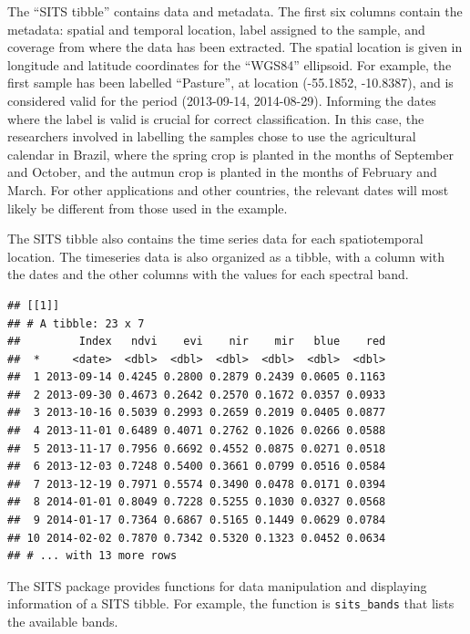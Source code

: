 \documentclass[11pt,]{article}
\newenvironment{Shaded}{\begin{snugshade}}{\end{snugshade}}
\newcommand{\DecValTok}[1]{\textcolor[rgb]{0.00,0.00,0.81}{#1}}
\newcommand{\CommentTok}[1]{\textcolor[rgb]{0.56,0.35,0.01}{\textit{#1}}}
\newcommand{\OperatorTok}[1]{\textcolor[rgb]{0.81,0.36,0.00}{\textbf{#1}}}
\newcommand{\NormalTok}[1]{#1}
\begin{document}
The ``SITS tibble'' contains data and metadata. The first six columns
contain the metadata: spatial and temporal location, label assigned to
the sample, and coverage from where the data has been extracted. The
spatial location is given in longitude and latitude coordinates for the
``WGS84'' ellipsoid. For example, the first sample has been labelled
``Pasture'', at location (-55.1852, -10.8387), and is considered valid
for the period (2013-09-14, 2014-08-29). Informing the dates where the
label is valid is crucial for correct classification. In this case, the
researchers involved in labelling the samples chose to use the
agricultural calendar in Brazil, where the spring crop is planted in the
months of September and October, and the autmun crop is planted in the
months of February and March. For other applications and other
countries, the relevant dates will most likely be different from those
used in the example.

The SITS tibble also contains the time series data for each
spatiotemporal location. The timeseries data is also organized as a
tibble, with a column with the dates and the other columns with the
values for each spectral band.

\begin{Shaded}
\end{Shaded}

\begin{verbatim}
## [[1]]
## # A tibble: 23 x 7
##         Index   ndvi    evi    nir    mir   blue    red
##  *     <date>  <dbl>  <dbl>  <dbl>  <dbl>  <dbl>  <dbl>
##  1 2013-09-14 0.4245 0.2800 0.2879 0.2439 0.0605 0.1163
##  2 2013-09-30 0.4673 0.2642 0.2570 0.1672 0.0357 0.0933
##  3 2013-10-16 0.5039 0.2993 0.2659 0.2019 0.0405 0.0877
##  4 2013-11-01 0.6489 0.4071 0.2762 0.1026 0.0266 0.0588
##  5 2013-11-17 0.7956 0.6692 0.4552 0.0875 0.0271 0.0518
##  6 2013-12-03 0.7248 0.5400 0.3661 0.0799 0.0516 0.0584
##  7 2013-12-19 0.7971 0.5574 0.3490 0.0478 0.0171 0.0394
##  8 2014-01-01 0.8049 0.7228 0.5255 0.1030 0.0327 0.0568
##  9 2014-01-17 0.7364 0.6867 0.5165 0.1449 0.0629 0.0784
## 10 2014-02-02 0.7870 0.7342 0.5320 0.1323 0.0452 0.0634
## # ... with 13 more rows
\end{verbatim}

The SITS package provides functions for data manipulation and displaying
information of a SITS tibble. For example, the function is
\texttt{sits\_bands} that lists the available bands.
\end{document}
